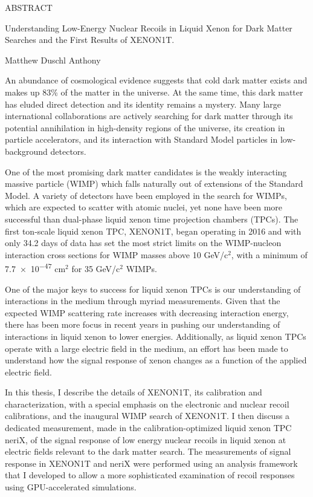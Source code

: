 
\pagestyle{empty} %
\begin{center}
  ABSTRACT

    Understanding Low-Energy Nuclear Recoils in Liquid Xenon for Dark Matter Searches and the First Results of XENON1T.

    Matthew Duschl Anthony
\end{center}

An abundance of cosmological evidence suggests that cold dark matter exists and makes up 83\% of the matter in the universe.  At the same time, this dark matter has eluded direct detection and its identity remains a mystery.  Many large international collaborations are actively searching for dark matter through its potential annihilation in high-density regions of the universe, its creation in particle accelerators, and its interaction with Standard Model particles in low-background detectors.

One of the most promising dark matter candidates is the weakly interacting massive particle (WIMP) which falls naturally out of extensions of the Standard Model.  A variety of detectors have been employed in the search for WIMPs, which are expected to scatter with atomic nuclei, yet none have been more successful than dual-phase liquid xenon time projection chambers (TPCs).  The first ton-scale liquid xenon TPC, XENON1T, began operating in 2016 and with only 34.2 days of data has set the most strict limits on the WIMP-nucleon interaction cross sections for WIMP masses above 10 GeV/$\textrm{c}^2$, with a minimum of \num{7.7e-47} $\textrm{cm}^2$ for 35 GeV/$\textrm{c}^2$ WIMPs.

One of the major keys to success for liquid xenon TPCs is our understanding of interactions in the medium through myriad measurements.  Given that the expected WIMP scattering rate increases with decreasing interaction energy, there has been more focus in recent years in pushing our understanding of interactions in liquid xenon to lower energies.  Additionally, as liquid xenon TPCs operate with a large electric field in the medium, an effort has been made to understand how the signal response of xenon changes as a function of the applied electric field.      
   
In this thesis, I describe the details of XENON1T, its calibration and characterization, with a special emphasis on the electronic and nuclear recoil calibrations, and the inaugural WIMP search of XENON1T.    I then discuss a dedicated measurement, made in the calibration-optimized liquid xenon TPC neriX, of the signal response of low energy nuclear recoils in liquid xenon at electric fields relevant to the dark matter search.  The measurements of signal response in XENON1T and neriX were performed using an analysis framework that I developed to allow a more sophisticated examination of recoil responses using GPU-accelerated simulations.



